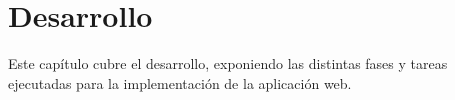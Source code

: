 \chapter{Desarrollo}
Este capítulo cubre el desarrollo, exponiendo las distintas fases y tareas ejecutadas para la implementación de la aplicación web.





